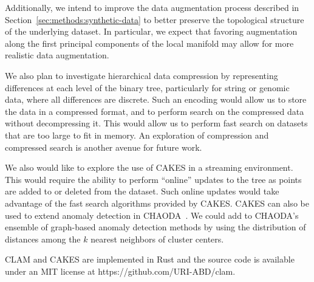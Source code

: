 Additionally, we intend to improve the data augmentation process described in Section~\ref{sec:methods:synthetic-data} to better preserve the topological structure of the underlying dataset. 
In particular, we expect that favoring augmentation along the first principal components of the local manifold may allow for more realistic data augmentation. 

We also plan to investigate hierarchical data compression by representing differences at each level of the binary tree, particularly for string or genomic data, where all differences are discrete.
Such an encoding would allow us to store the data in a compressed format, and to perform search on the compressed data without decompressing it.
This would allow us to perform fast search on datasets that are too large to fit in memory.
An exploration of compression and compressed search is another avenue for future work.

We also would like to explore the use of CAKES in a streaming environment.
This would require the ability to perform ``online'' updates to the tree as points are added to or deleted from the dataset.
Such online updates would take advantage of the fast search algorithms provided by CAKES.  %
CAKES can also be used to extend anomaly detection in CHAODA~\cite{ishaq2021clustered}.
We could add to CHAODA's ensemble of graph-based anomaly detection methods by using the distribution of distances among the $k$ nearest neighbors of cluster centers.

CLAM and CAKES are implemented in Rust and the source code is available under an MIT license at https://github.com/URI-ABD/clam.

